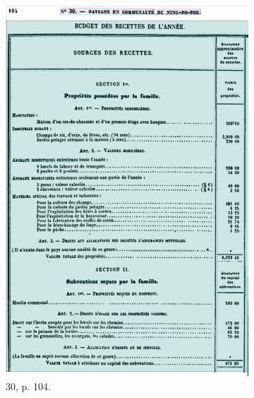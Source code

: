 \begin{figure}[t]
    \centering
    \begin{subfigure}{0.3\textwidth}
     \includegraphics[width=1\linewidth]{img/transkribus_30.png}
     \caption{\no{} 30, p. 104.}
     \label{fig:odm30tkb}
    \end{subfigure}
    \hspace{5pt}
    \begin{subfigure}{0.3\textwidth}

\end{subfigure}
\end{figure}
